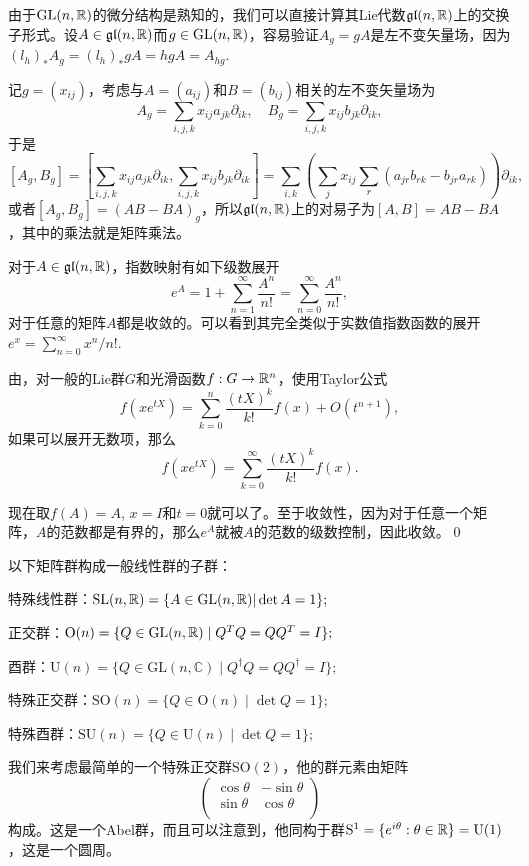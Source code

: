 \documentclass[9pt]{extarticle}
\newcommand{\cc}{\mathbb{C}}
\begin{document}

由于$\mathrm{GL}(n,\mathbb{R})$的微分结构是熟知的，我们可以直接计算其Lie代数$\mathfrak{gl}(n,\mathbb{R})$上的交换子形式。设$A\in\mathfrak{gl}(n,\mathbb{R})$而$g\in\mathrm{GL}(n,\mathbb{R})$，容易验证$A_g=gA$是左不变矢量场，因为$(l_h)_{*}A_g=(l_h)_{*}gA=hgA=A_{hg}$.

记$g=(x_{ij})$，考虑与$A=(a_{ij})$和$B=(b_{ij})$相关的左不变矢量场为
\[
A_g=\sum_{i,j,k}x_{ij}a_{jk}\partial_{ik},\quad B_g=\sum_{i,j,k}x_{ij}b_{jk}\partial_{ik},
\]
于是
\[
[A_g,B_g]=\left[\sum_{i,j,k}x_{ij}a_{jk}\partial_{ik},\sum_{i,j,k}x_{ij}b_{jk}\partial_{ik}\right]=\sum_{i,k}\left(\sum_{j}x_{ij}\sum_{r}(a_{jr}b_{rk}-b_{jr}a_{rk})\right)\partial_{ik},
\]
或者$[A_g,B_g]=(AB-BA)_g$，所以$\mathfrak{gl}(n,\mathbb{R})$上的对易子为$[A,B]=AB-BA$，其中的乘法就是矩阵乘法。

\para 对于$A\in\mathfrak{gl}(n,\mathbb{R})$，指数映射有如下级数展开
\[
	e^A=1+\sum_{n=1}^\infty \frac{A^n}{n!}=\sum_{n=0}^\infty \frac{A^n}{n!},
\]
对于任意的矩阵$A$都是收敛的。可以看到其完全类似于实数值指数函数的展开$e^x=\sum_{n=0}^\infty x^n/n!$.

\proof 由，对一般的Lie群$G$和光滑函数$f:G\to \mathbb{R}^n$，使用Taylor公式
\[
	f(xe^{tX})=\sum_{k=0}^n\frac{(tX)^{k}}{k!}f(x)+O(t^{n+1}),
\]
如果可以展开无数项，那么
\[
	f(xe^{tX})=\sum_{k=0}^\infty\frac{(tX)^{k}}{k!}f(x).
\]

现在取$f(A)=A$, $x=I$和$t=0$就可以了。至于收敛性，因为对于任意一个矩阵，$A$的范数都是有界的，那么$e^A$就被$A$的范数的级数控制，因此收敛。\qed

\para 以下矩阵群构成一般线性群的子群：

 特殊线性群：$\mathrm{SL}(n,\mathbb{R})=\{A\in \mathrm{GL}(n,\mathbb{R})|\det A=1\};$

 正交群：$\mathrm{O}(n) = \{ Q \in \mathrm{GL}(n,\mathbb{R}) \mid Q^T Q = Q Q^T = I \};$

 酉群：$\mathrm{U}(n) = \{ Q \in \mathrm{GL}(n,\cc) \mid Q^\dag Q = Q Q^\dag = I \};$

 特殊正交群：$\mathrm{SO}(n) =\{ Q \in \mathrm{O}(n) \mid \det Q=1 \};$

 特殊酉群：$\mathrm{SU}(n) =\{ Q \in \mathrm{U}(n) \mid \det Q=1 \};$

我们来考虑最简单的一个特殊正交群$\mathrm{SO}(2)$，他的群元素由矩阵
\[
	\begin{pmatrix}
	\cos \theta&-\sin \theta\\
	\sin \theta&\cos \theta\\
	\end{pmatrix}
\]
构成。这是一个Abel群，而且可以注意到，他同构于群$\mathrm{S}^1=\{e^{i\theta}:\theta\in\mathbb{R}\}=\mathrm{U}(1)$，这是一个圆周。
\end{document}
